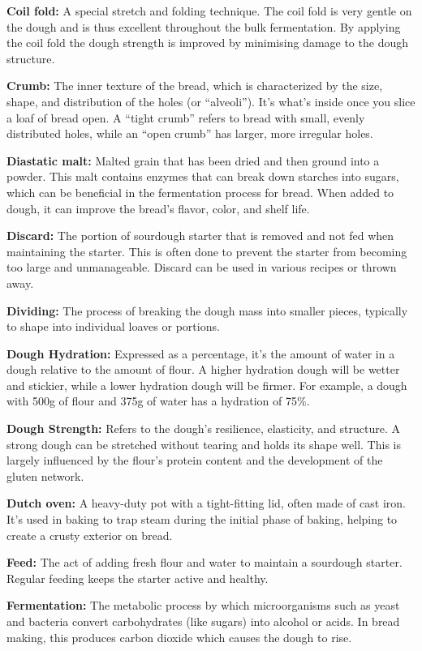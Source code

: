 \textbf{Coil fold:} A special stretch and folding technique. The coil fold is
very gentle on the dough and is thus excellent throughout the bulk fermentation.
By applying the coil fold the dough strength is improved by minimising damage
to the dough structure.

\textbf{Crumb:} The inner texture of the bread, which is characterized by the size,
shape, and distribution of the holes (or ``alveoli''). It's what's inside once you slice
a loaf of bread open. A ``tight crumb'' refers to bread with small, evenly distributed
holes, while an ``open crumb'' has larger, more irregular holes.

\textbf{Diastatic malt:} Malted grain that has been dried and then ground into a powder.
This malt contains enzymes that can break down starches into sugars, which can be
beneficial in the fermentation process for bread. When added to dough, it can improve
the bread's flavor, color, and shelf life.

\textbf{Discard:} The portion of sourdough starter that is removed and not fed when
maintaining the starter. This is often done to prevent the starter from becoming too
large and unmanageable. Discard can be used in various recipes or thrown away.

\textbf{Dividing:} The process of breaking the dough mass into smaller pieces,
typically to shape into individual loaves or portions.

\textbf{Dough Hydration:} Expressed as a percentage, it's the amount of water in a
dough relative to the amount of flour. A higher hydration dough will be wetter and
stickier, while a lower hydration dough will be firmer. For example, a dough with 500g
of flour and 375g of water has a hydration of 75\%.

\textbf{Dough Strength:} Refers to the dough's resilience, elasticity, and structure.
A strong dough can be stretched without tearing and holds its shape well. This is
largely influenced by the flour's protein content and the development of the gluten
network.

\textbf{Dutch oven:} A heavy-duty pot with a tight-fitting lid, often made of cast
iron. It's used in baking to trap steam during the initial phase of baking, helping
to create a crusty exterior on bread.

\textbf{Feed:} The act of adding fresh flour and water to maintain a sourdough
starter. Regular feeding keeps the starter active and healthy.

\textbf{Fermentation:} The metabolic process by which microorganisms such as yeast
and bacteria convert carbohydrates (like sugars) into alcohol or acids. In bread
making, this produces carbon dioxide which causes the dough to rise.

